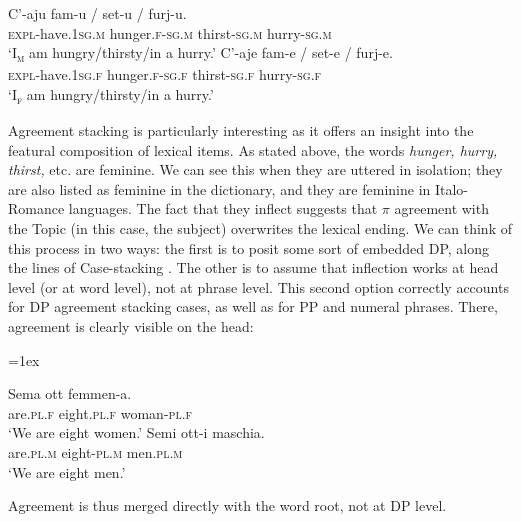 \documentclass[output=paper
,modfonts
,nonflat]{langsci/langscibook}
\begin{document}
\begin{exe} 
	\ex  \xlist
	\ex 
	\gll C'-aju     fam-u / set-u / furj-u.\\
	\textsc{expl}{}-have.\textsc{1sg.m}  hunger.\textsc{f-sg.m} {} thirst-\textsc{sg.m} {} hurry-\textsc{sg.m}\\
	\glt`I\textsc{\textsubscript{m}} am hungry/thirsty/in a hurry.'
	\ex
	\gll  C'-aje     fam-e / set-e / furj-e.\\
	\textsc{expl}{}-have.\textsc{1sg.f} hunger.\textsc{f-sg.f} {} thirst-\textsc{sg.f} {} hurry-\textsc{sg.f}\\ 
	\glt `I\textsc{\textsubscript{f}} am hungry/thirsty/in a hurry.'
	\endxlist
\end{exe}
Agreement stacking is particularly interesting as it offers an insight into the featural composition of lexical items. As stated above, the words \textit{hunger, hurry, thirst,} etc. are feminine. We can see this when they are uttered in isolation; they are also listed as feminine in the dictionary, and they are feminine in Italo-Romance languages. The fact that they inflect suggests that $\pi $ agreement with the Topic (in this case, the subject) overwrites the lexical ending. We can think of this process in two ways: the first is to posit some sort of embedded DP, along the lines of Case-stacking \citep{McCreight1988, Nordlinger1998, Merchant2006, Richards2013, Pesetsky2013}. The other is to assume that inflection works at head level (or at word level), not at phrase level. This second option correctly accounts for DP agreement stacking cases, as well as for PP and numeral phrases. There, agreement is clearly visible on the head: 

\begin{exe} 
	\ex \citet[30]{Lambertelli2003} \xlist
	{\multicolsep=1ex\begin{multicols}{2}\ex 
	\gll Sema   ott\footnotemark  {}  femmen-a.\\ 
	are.\textsc{pl.f} eight.\textsc{pl.f} woman-\textsc{pl.f}\\
	\glt`We are eight women.'
	\ex
	\gll Semi     ott-i     maschia.\\
	are.\textsc{pl.m} eight-\textsc{pl.m} men.\textsc{pl.m}\\ 
	\glt `We are eight men.'\end{multicols}}
	\endxlist
\end{exe}
Agreement is thus merged directly with the word root, not at DP level.
\end{document}
